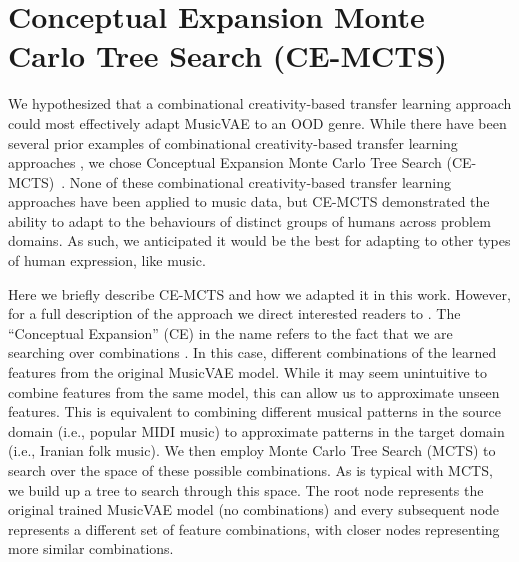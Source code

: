\documentclass[letterpaper]{article}
\begin{document}
\section{Conceptual Expansion Monte Carlo Tree Search (CE-MCTS)}

We hypothesized that a combinational creativity-based transfer learning approach could most effectively adapt MusicVAE to an OOD genre. 
While there have been several prior examples of combinational creativity-based transfer learning approaches \cite{banerjee2021combinets,singamsetti2021conceptual}, we chose Conceptual Expansion Monte Carlo Tree Search (CE-MCTS)~\cite{Mahajan2023}. 
None of these combinational creativity-based transfer learning approaches have been applied to music data, but CE-MCTS demonstrated the ability to adapt to the behaviours of distinct groups of humans across problem domains. 
As such, we anticipated it would be the best for adapting to other types of human expression, like music.

Here we briefly describe CE-MCTS and how we adapted it in this work. However, for a full description of the approach we direct interested readers to \cite{Mahajan2023}.
The ``Conceptual Expansion'' (CE) in the name refers to the fact that we are searching over combinations \cite{banerjee2021combinets}. 
In this case, different combinations of the learned features from the original MusicVAE model. 
While it may seem unintuitive to combine features from the same model, this can allow us to approximate unseen features.
This is equivalent to combining different musical patterns in the source domain (i.e., popular MIDI music) to approximate patterns in the target domain (i.e., Iranian folk music).
We then employ Monte Carlo Tree Search (MCTS) to search over the space of these possible combinations. 
As is typical with MCTS, we build up a tree to search through this space. 
The root node represents the original trained MusicVAE model (no combinations) and every subsequent node represents a different set of feature combinations, with closer nodes representing more similar combinations. 

\end{document}
